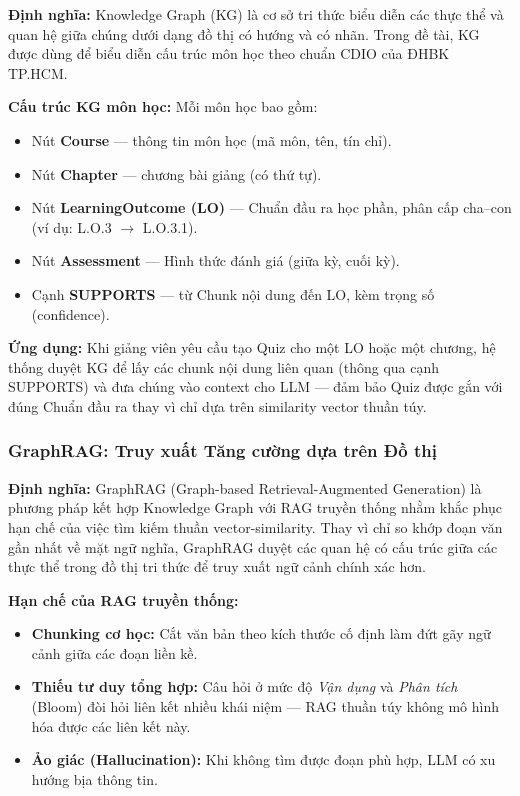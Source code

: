 \textbf{Định nghĩa:} Knowledge Graph (KG) là cơ sở tri thức biểu diễn các
thực thể và quan hệ giữa chúng dưới dạng đồ thị có hướng và có nhãn.
Trong đề tài, KG được dùng để biểu diễn cấu trúc môn học theo chuẩn CDIO
của ĐHBK TP.HCM.

\textbf{Cấu trúc KG môn học:} Mỗi môn học bao gồm:
\begin{itemize}
    \item Nút \textbf{Course} --- thông tin môn học (mã môn, tên, tín chỉ).
    \item Nút \textbf{Chapter} --- chương bài giảng (có thứ tự).
    \item Nút \textbf{LearningOutcome (LO)} --- Chuẩn đầu ra học phần,
          phân cấp cha--con (ví dụ: L.O.3 $\to$ L.O.3.1).
    \item Nút \textbf{Assessment} --- Hình thức đánh giá (giữa kỳ, cuối kỳ).
    \item Cạnh \textbf{SUPPORTS} --- từ Chunk nội dung đến LO, kèm trọng số
          (confidence).
\end{itemize}

\textbf{Ứng dụng:} Khi giảng viên yêu cầu tạo Quiz cho một LO hoặc một
chương, hệ thống duyệt KG để lấy các chunk nội dung liên quan (thông qua cạnh
SUPPORTS) và đưa chúng vào context cho LLM --- đảm bảo Quiz được gắn với
đúng Chuẩn đầu ra thay vì chỉ dựa trên similarity vector thuần túy.

\subsubsection{GraphRAG: Truy xuất Tăng cường dựa trên Đồ thị}

\textbf{Định nghĩa:} GraphRAG (Graph-based Retrieval-Augmented Generation) là
phương pháp kết hợp Knowledge Graph với RAG truyền thống nhằm khắc phục hạn
chế của việc tìm kiếm thuần vector-similarity. Thay vì chỉ so khớp đoạn văn
gần nhất về mặt ngữ nghĩa, GraphRAG duyệt các quan hệ có cấu trúc giữa các
thực thể trong đồ thị tri thức để truy xuất ngữ cảnh chính xác hơn.

\textbf{Hạn chế của RAG truyền thống:}
\begin{itemize}
    \item \textbf{Chunking cơ học:} Cắt văn bản theo kích thước cố định làm
          đứt gãy ngữ cảnh giữa các đoạn liền kề.
    \item \textbf{Thiếu tư duy tổng hợp:} Câu hỏi ở mức độ \textit{Vận dụng}
          và \textit{Phân tích} (Bloom) đòi hỏi liên kết nhiều khái niệm ---
          RAG thuần túy không mô hình hóa được các liên kết này.
    \item \textbf{Ảo giác (Hallucination):} Khi không tìm được đoạn phù hợp,
          LLM có xu hướng bịa thông tin.
\end{itemize}

